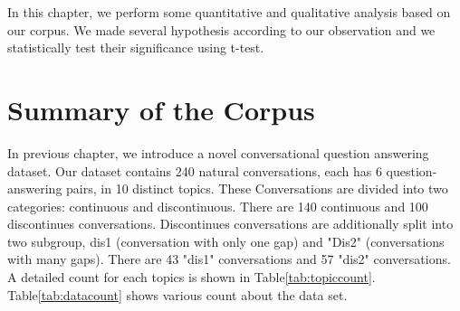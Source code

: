 \documentclass[bsc,frontabs,twoside,singlespacing,parskip,deptreport]{infthesis}     %
\begin{document}
In this chapter, we perform some quantitative and qualitative analysis based on our corpus. We made several hypothesis according to our observation and we statistically test their significance using t-test.

\section{Summary of the Corpus}

In previous chapter, we introduce a novel conversational question answering dataset. Our dataset contains 240 natural conversations, each has 6 question-answering pairs, in 10 distinct topics. These Conversations are divided into two categories: continuous and discontinuous. There are 140 continuous and 100 discontinues conversations. Discontinues conversations are additionally split into two subgroup, dis1 (conversation with only one gap) and "Dis2" (conversations with many gaps). There are 43 "dis1" conversations and 57 "dis2" conversations. A detailed count for each topics is shown in Table\ref{tab:topiccount}. Table\ref{tab:datacount} shows various count about the data set. 

\begin{table}[]
\caption{Detailed Topics Count for the Corpus.}
\label{tab:topiccount}
\end{table}
\end{document}
